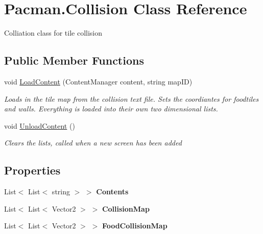 \hypertarget{class_pacman_1_1_collision}{\section{Pacman.\-Collision Class Reference}
\label{class_pacman_1_1_collision}
}


Colliation class for tile collision  


\subsection*{Public Member Functions}
\begin{DoxyCompactItemize}
\item 
void \hyperlink{class_pacman_1_1_collision_a7612e258761f4f2b1e35eb782813baaf}{Load\-Content} (Content\-Manager content, string map\-I\-D)
\begin{DoxyCompactList}\small\item\em Loads in the tile map from the collision text file. Sets the coordiantes for foodtiles and walls. Everything is loaded into their own two dimensional lists. \end{DoxyCompactList}\item 
void \hyperlink{class_pacman_1_1_collision_a321cf26905ad06ac98f9fac0009db02c}{Unload\-Content} ()
\begin{DoxyCompactList}\small\item\em Clears the lists, called when a new screen has been added \end{DoxyCompactList}\end{DoxyCompactItemize}
\subsection*{Properties}
\begin{DoxyCompactItemize}
\item 
\hypertarget{class_pacman_1_1_collision_a23673582569806fea95a422f6cf347e2}{List$<$ List$<$ string $>$ $>$ {\bfseries Contents}}\label{class_pacman_1_1_collision_a23673582569806fea95a422f6cf347e2}

\item 
\hypertarget{class_pacman_1_1_collision_a9971714d68aa3936cbf7b1ceb6e608ad}{List$<$ List$<$ Vector2 $>$ $>$ {\bfseries Collision\-Map}}\label{class_pacman_1_1_collision_a9971714d68aa3936cbf7b1ceb6e608ad}

\item 
\hypertarget{class_pacman_1_1_collision_a2b876db84e06b93316fbccec5c338ea6}{List$<$ List$<$ Vector2 $>$ $>$ {\bfseries Food\-Collision\-Map}}\label{class_pacman_1_1_collision_a2b876db84e06b93316fbccec5c338ea6}

\end{DoxyCompactItemize}


